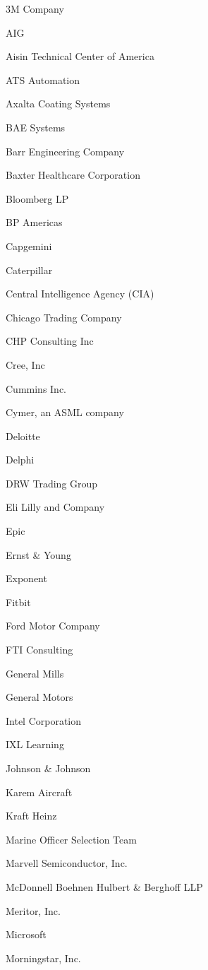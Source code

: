 \documentclass[twoside]{article}
\begin{document}
\begin{center}
\begin{multicols}{5}
\begin{FlushLeft}
        \begin{compactitem}
        \item 3M Company
\item AIG
\item Aisin Technical Center of America
\item ATS Automation
\item Axalta Coating Systems
\item BAE Systems
\item Barr Engineering Company
\item Baxter Healthcare Corporation
\item Bloomberg LP
\item BP Americas
\item Capgemini
\item Caterpillar
\item Central Intelligence Agency (CIA)
\item Chicago Trading Company
\item CHP Consulting Inc
\item Cree, Inc
\item Cummins Inc.
\item Cymer, an ASML company
\item Deloitte
\item Delphi
\item DRW Trading Group
\item Eli Lilly and Company
\item Epic
\item Ernst \& Young
\item Exponent
\item Fitbit
\item Ford Motor Company
\item FTI Consulting
\item General Mills
\item General Motors
\item Intel Corporation
\item IXL Learning
\item Johnson \& Johnson
\item Karem Aircraft
\item Kraft Heinz
\item Marine Officer Selection Team
\item Marvell Semiconductor, Inc.
\item McDonnell Boehnen Hulbert \& Berghoff LLP
\item Meritor, Inc.
\item Microsoft
\item Morningstar, Inc.

\end{compactitem}
\end{FlushLeft}
\end{multicols}
\end{center}
\end{document}
